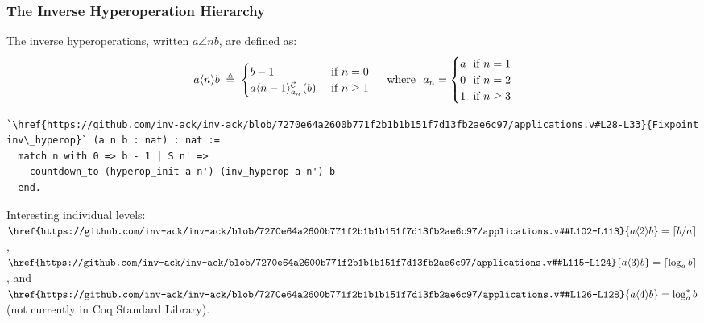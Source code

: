 \begin{frame}[fragile]
\frametitle{The Inverse Hyperoperation Hierarchy}
The inverse hyperoperations, written $a\angle{n}b$, are defined as:
\begin{equation*}
a\angle{n}b \; \triangleq \; \begin{cases}
b - 1 & \text{ if } n = 0 \\
\cdt{a\angle{n-1}}{a_n}(b) & \text{ if } n \ge 1
\end{cases}
\quad \text{ where } \ a_n = \begin{cases}
a & \hspace{-7pt}\text{ if } n = 1 \\
0 & \hspace{-7pt}\text{ if } n = 2 \\
1 & \hspace{-7pt}\text{ if } n \ge 3
\end{cases}
\end{equation*}
\vspace{-1em}
\pause 
\begin{lstlisting}
`\href{https://github.com/inv-ack/inv-ack/blob/7270e64a2600b771f2b1b1b151f7d13fb2ae6c97/applications.v#L28-L33}{Fixpoint inv\_hyperop}` (a n b : nat) : nat :=
  match n with 0 => b - 1 | S n' =>
    countdown_to (hyperop_init a n') (inv_hyperop a n') b
  end.
\end{lstlisting}

\smallskip

\pause 
Interesting individual levels:
$\href{https://github.com/inv-ack/inv-ack/blob/7270e64a2600b771f2b1b1b151f7d13fb2ae6c97/applications.v#L102-L113}{a\angle{2}b}
= \left\lceil b/a \right\rceil$,
$\href{https://github.com/inv-ack/inv-ack/blob/7270e64a2600b771f2b1b1b151f7d13fb2ae6c97/applications.v#L115-L124}{a\angle{3}b}
= \left\lceil \log_a b \right\rceil$, and
$\href{https://github.com/inv-ack/inv-ack/blob/7270e64a2600b771f2b1b1b151f7d13fb2ae6c97/applications.v#L126-L128}{a\angle{4}b}
= \log^*_a b$ (not currently in Coq Standard Library).
\end{frame}


